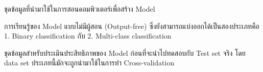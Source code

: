 \begin{description}[style=nextline]
    \item[Training set] ชุดข้อมูลที่นำมาใช้ในการสอนคอมพิวเตอร์เพื่อสร้าง Model
    \item[Unsupervised learning] การเรียนรู้ของ Model แบบไม่มีผู้สอน (Output-free)
    ซึ่งยังสามารถแบ่งออกได้เป็นสองประเภทคือ 1. Binary classification กับ 2. Multi-class classification
    \item[Validation set] ชุดข้อมูลสำหรับประเมินประสิทธิภาพของ Model ก่อนที่จะนำไปทดสอบกับ Test set จริง 
    โดย data set ประเภทนี้มักจะถูกนำมาใช้ในการทำ Cross-validation
\end{description}
